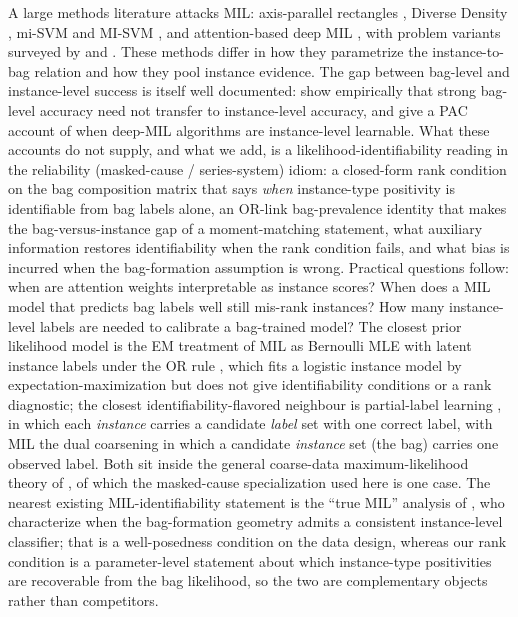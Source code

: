A large methods literature attacks MIL: axis-parallel rectangles
\citep{dietterich1997solving}, Diverse Density
\citep{maron1998framework}, mi-SVM and MI-SVM
\citep{andrews2003support}, and attention-based deep MIL
\citep{ilse2018attention}, with problem variants surveyed by
\citet{carbonneau2018multiple} and \citet{foulds2010review}. These
methods differ in how they parametrize the instance-to-bag relation
and how they pool instance evidence. The gap between bag-level and
instance-level success is itself well documented:
\citet{vanwinckelen2016instance} show empirically that strong
bag-level accuracy need not transfer to instance-level accuracy, and
\citet{jang2024learnable} give a PAC account of when deep-MIL
algorithms are instance-level learnable. What these accounts do not
supply, and what we add, is a likelihood-identifiability reading in
the reliability (masked-cause / series-system) idiom: a closed-form
rank condition on the bag composition matrix that says \emph{when}
instance-type positivity is identifiable from bag labels alone, an OR-link
bag-prevalence identity that makes the bag-versus-instance gap of
\citet{vanwinckelen2016instance} a moment-matching statement, what
auxiliary information restores identifiability when the rank condition
fails, and what bias is incurred when the bag-formation assumption is
wrong. Practical questions follow: when are attention weights
interpretable as instance scores? When does a MIL model that predicts
bag labels well still mis-rank instances? How many instance-level
labels are needed to calibrate a bag-trained model? The closest prior
likelihood model is the EM treatment of MIL as Bernoulli MLE with
latent instance labels under the OR rule
\citep{chen2017milr}, which fits a logistic instance model by
expectation-maximization but does not give identifiability conditions
or a rank diagnostic; the closest identifiability-flavored neighbour
is partial-label learning \citep{cour2011learning}, in which each
\emph{instance} carries a candidate \emph{label} set with one
correct label, with MIL the dual coarsening in which a candidate
\emph{instance} set (the bag) carries one observed label. Both sit
inside the general coarse-data maximum-likelihood theory of
\citet{couso2017coarse}, of which the masked-cause specialization used
here is one case. The nearest existing MIL-identifiability statement is
the ``true MIL'' analysis of \citet{doran2014theoretical}, who
characterize when the bag-formation geometry admits a consistent
instance-level classifier; that is a well-posedness condition on the
data design, whereas our rank condition is a parameter-level statement
about which instance-type positivities are recoverable from the bag
likelihood, so the two are complementary objects rather than competitors.

